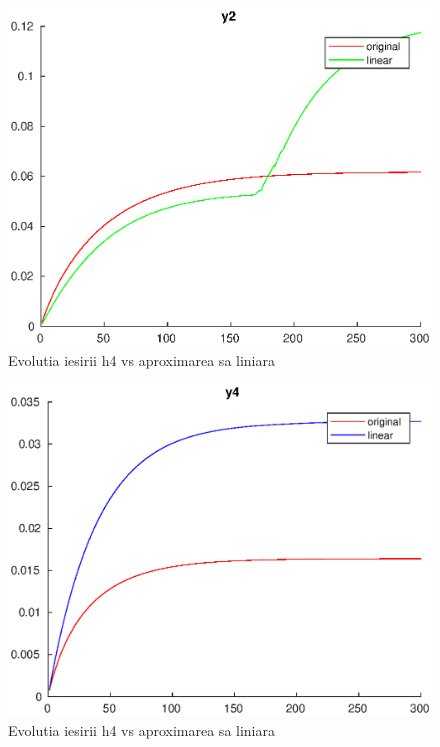 \documentclass[12pt,english]{article}
\begin{document}
\begin{figure} [H]
	\includegraphics[width=1\textwidth]{fgh_1.eps}
	\caption{Evolutia iesirii h4 vs aproximarea sa liniara}
\end{figure}

\begin{figure} [H]
	\includegraphics[width=1\textwidth]{fgh_2.eps}
	\caption{Evolutia iesirii h4 vs aproximarea sa liniara}
\end{figure}
\end{document}
